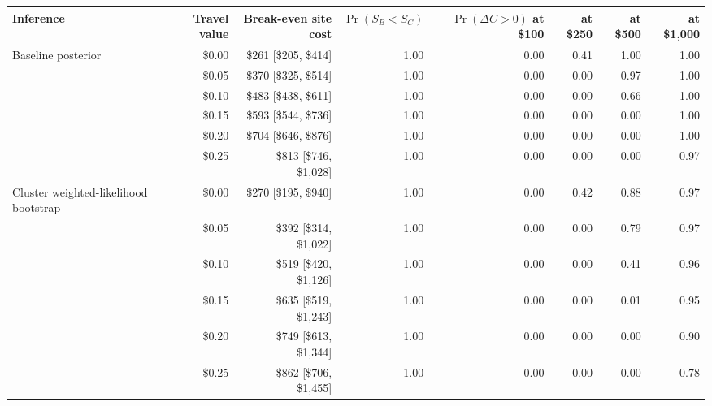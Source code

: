 \begin{tabular}{lrrrrrrr}
\toprule
Inference & Travel value & Break-even site cost & $\Pr(S_B<S_C)$ & $\Pr(\Delta C>0)$ at \$100 & at \$250 & at \$500 & at \$1,000 \\
\midrule
Baseline posterior & \$0.00 & \makecell[c]{\$261\\{}[\$205, \$414]} & 1.00 & 0.00 & 0.41 & 1.00 & 1.00 \\
 & \$0.05 & \makecell[c]{\$370\\{}[\$325, \$514]} & 1.00 & 0.00 & 0.00 & 0.97 & 1.00 \\
 & \$0.10 & \makecell[c]{\$483\\{}[\$438, \$611]} & 1.00 & 0.00 & 0.00 & 0.66 & 1.00 \\
 & \$0.15 & \makecell[c]{\$593\\{}[\$544, \$736]} & 1.00 & 0.00 & 0.00 & 0.00 & 1.00 \\
 & \$0.20 & \makecell[c]{\$704\\{}[\$646, \$876]} & 1.00 & 0.00 & 0.00 & 0.00 & 1.00 \\
 & \$0.25 & \makecell[c]{\$813\\{}[\$746, \$1,028]} & 1.00 & 0.00 & 0.00 & 0.00 & 0.97 \\
\addlinespace
Cluster weighted-likelihood bootstrap & \$0.00 & \makecell[c]{\$270\\{}[\$195, \$940]} & 1.00 & 0.00 & 0.42 & 0.88 & 0.97 \\
 & \$0.05 & \makecell[c]{\$392\\{}[\$314, \$1,022]} & 1.00 & 0.00 & 0.00 & 0.79 & 0.97 \\
 & \$0.10 & \makecell[c]{\$519\\{}[\$420, \$1,126]} & 1.00 & 0.00 & 0.00 & 0.41 & 0.96 \\
 & \$0.15 & \makecell[c]{\$635\\{}[\$519, \$1,243]} & 1.00 & 0.00 & 0.00 & 0.01 & 0.95 \\
 & \$0.20 & \makecell[c]{\$749\\{}[\$613, \$1,344]} & 1.00 & 0.00 & 0.00 & 0.00 & 0.90 \\
 & \$0.25 & \makecell[c]{\$862\\{}[\$706, \$1,455]} & 1.00 & 0.00 & 0.00 & 0.00 & 0.78 \\
\bottomrule
\end{tabular}
